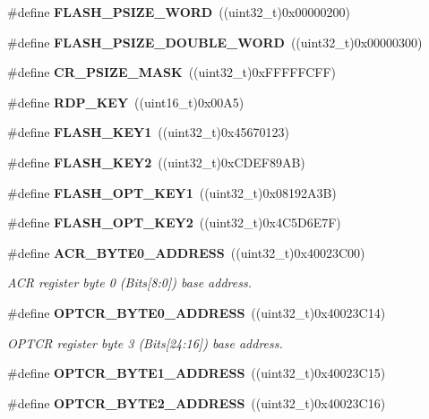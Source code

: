 \begin{DoxyCompactItemize}
$$\item 
\#define \textbf{ F\+L\+A\+S\+H\+\_\+\+P\+S\+I\+Z\+E\+\_\+\+W\+O\+RD}~((uint32\+\_\+t)0x00000200)
\item 
\#define \textbf{ F\+L\+A\+S\+H\+\_\+\+P\+S\+I\+Z\+E\+\_\+\+D\+O\+U\+B\+L\+E\+\_\+\+W\+O\+RD}~((uint32\+\_\+t)0x00000300)
\item 
\#define \textbf{ C\+R\+\_\+\+P\+S\+I\+Z\+E\+\_\+\+M\+A\+SK}~((uint32\+\_\+t)0x\+F\+F\+F\+F\+F\+C\+F\+F)
\item 
\#define \textbf{ R\+D\+P\+\_\+\+K\+EY}~((uint16\+\_\+t)0x00\+A5)
\item 
\#define \textbf{ F\+L\+A\+S\+H\+\_\+\+K\+E\+Y1}~((uint32\+\_\+t)0x45670123)
\item 
\#define \textbf{ F\+L\+A\+S\+H\+\_\+\+K\+E\+Y2}~((uint32\+\_\+t)0x\+C\+D\+E\+F89\+A\+B)
\item 
\#define \textbf{ F\+L\+A\+S\+H\+\_\+\+O\+P\+T\+\_\+\+K\+E\+Y1}~((uint32\+\_\+t)0x08192\+A3\+B)
\item 
\#define \textbf{ F\+L\+A\+S\+H\+\_\+\+O\+P\+T\+\_\+\+K\+E\+Y2}~((uint32\+\_\+t)0x4\+C5\+D6\+E7\+F)
\item 
\#define \textbf{ A\+C\+R\+\_\+\+B\+Y\+T\+E0\+\_\+\+A\+D\+D\+R\+E\+SS}~((uint32\+\_\+t)0x40023\+C00)
\begin{DoxyCompactList}\small\item\em A\+CR register byte 0 (Bits[8\+:0]) base address. \end{DoxyCompactList}\item 
\#define \textbf{ O\+P\+T\+C\+R\+\_\+\+B\+Y\+T\+E0\+\_\+\+A\+D\+D\+R\+E\+SS}~((uint32\+\_\+t)0x40023\+C14)
\begin{DoxyCompactList}\small\item\em O\+P\+T\+CR register byte 3 (Bits[24\+:16]) base address. \end{DoxyCompactList}\item 
\#define \textbf{ O\+P\+T\+C\+R\+\_\+\+B\+Y\+T\+E1\+\_\+\+A\+D\+D\+R\+E\+SS}~((uint32\+\_\+t)0x40023\+C15)
\item 
\#define \textbf{ O\+P\+T\+C\+R\+\_\+\+B\+Y\+T\+E2\+\_\+\+A\+D\+D\+R\+E\+SS}~((uint32\+\_\+t)0x40023\+C16)
\end{DoxyCompactItemize}
